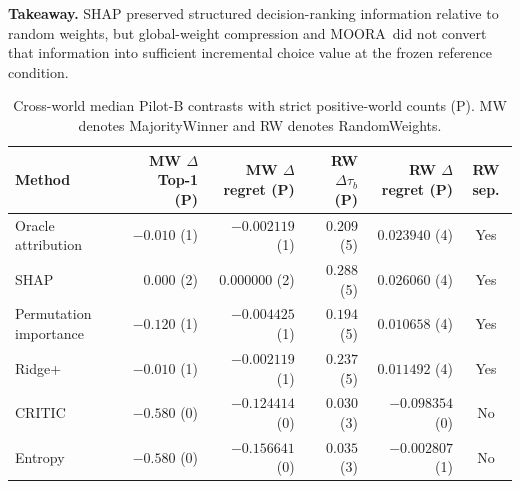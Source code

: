 \documentclass[runningheads]{llncs}
\newcommand{\MOORA}{MOORA}
\begin{document}
\noindent\textbf{Takeaway.} SHAP preserved structured decision-ranking information relative to
random weights, but global-weight compression and \MOORA\ did not convert that information into
sufficient incremental choice value at the frozen reference condition.

\begin{table}[t]
\centering
\caption{Cross-world median Pilot-B contrasts with strict positive-world counts (P). MW denotes
MajorityWinner and RW denotes RandomWeights.}
\label{tab:contrasts}
\scriptsize
\setlength{\tabcolsep}{2.5pt}
\begin{tabular}{@{}lrrrrc@{}}
\toprule
Method & \shortstack{MW\\$\Delta$Top-1 (P)} & \shortstack{MW\\$\Delta$regret (P)} &
\shortstack{RW\\$\Delta\tau_b$ (P)} & \shortstack{RW\\$\Delta$regret (P)} & RW sep.\\
\midrule
Oracle attribution & $-0.010$ (1) & $-0.002119$ (1) & $0.209$ (5) & $0.023940$ (4) & Yes\\
SHAP & $0.000$ (2) & $0.000000$ (2) & $0.288$ (5) & $0.026060$ (4) & Yes\\
Permutation importance & $-0.120$ (1) & $-0.004425$ (1) & $0.194$ (5) & $0.010658$ (4) & Yes\\
Ridge+ & $-0.010$ (1) & $-0.002119$ (1) & $0.237$ (5) & $0.011492$ (4) & Yes\\
CRITIC & $-0.580$ (0) & $-0.124414$ (0) & $0.030$ (3) & $-0.098354$ (0) & No\\
Entropy & $-0.580$ (0) & $-0.156641$ (0) & $0.035$ (3) & $-0.002807$ (1) & No\\
\bottomrule
\end{tabular}
\end{table}
\end{document}
